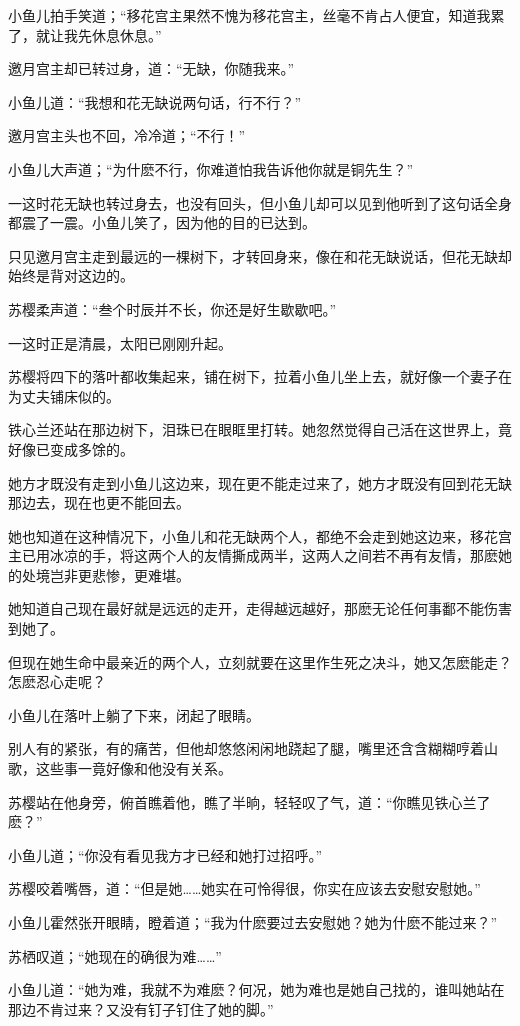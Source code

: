 \documentclass[12pt,oneside]{book}
\begin{document}
小鱼儿拍手笑道；``移花宫主果然不愧为移花宫主，丝毫不肯占人便宜，知道我累了，就让我先休息休息。''

邀月宫主却已转过身，道：``无缺，你随我来。''

小鱼儿道：``我想和花无缺说两句话，行不行？''

邀月宫主头也不回，冷冷道；``不行！''

小鱼儿大声道；``为什麽不行，你难道怕我告诉他你就是铜先生？''

一这时花无缺也转过身去，也没有回头，但小鱼儿却可以见到他听到了这句话全身都震了一震。小鱼儿笑了，因为他的目的已达到。

只见邀月宫主走到最远的一棵树下，才转回身来，像在和花无缺说话，但花无缺却始终是背对这边的。

苏樱柔声道：``叁个时辰并不长，你还是好生歇歇吧。''

一这时正是清晨，太阳已刚刚升起。

苏樱将四下的落叶都收集起来，铺在树下，拉着小鱼儿坐上去，就好像一个妻子在为丈夫铺床似的。

铁心兰还站在那边树下，泪珠已在眼眶里打转。她忽然觉得自己活在这世界上，竟好像已变成多馀的。

她方才既没有走到小鱼儿这边来，现在更不能走过来了，她方才既没有回到花无缺那边去，现在也更不能回去。

她也知道在这种情况下，小鱼儿和花无缺两个人，都绝不会走到她这边来，移花宫主已用冰凉的手，将这两个人的友情撕成两半，这两人之间若不再有友情，那麽她的处境岂非更悲惨，更难堪。

她知道自己现在最好就是远远的走开，走得越远越好，那麽无论任何事鄱不能伤害到她了。

但现在她生命中最亲近的两个人，立刻就要在这里作生死之决斗，她又怎麽能走？怎麽忍心走呢？

小鱼儿在落叶上躺了下来，闭起了眼睛。

别人有的紧张，有的痛苦，但他却悠悠闲闲地跷起了腿，嘴里还含含糊糊哼着山歌，这些事一竟好像和他没有关系。

苏樱站在他身旁，俯首瞧着他，瞧了半晌，轻轻叹了气，道：``你瞧见铁心兰了麽？''

小鱼儿道；``你没有看见我方才已经和她打过招呼。''

苏樱咬着嘴唇，道：``但是她\ldots\ldots 她实在可怜得很，你实在应该去安慰安慰她。''

小鱼儿霍然张开眼睛，瞪着道；``我为什麽要过去安慰她？她为什麽不能过来？''

苏栖叹道；``她现在的确很为难\ldots\ldots{}''

小鱼儿道：``她为难，我就不为难麽？何况，她为难也是她自己找的，谁叫她站在那边不肯过来？又没有钉子钉住了她的脚。''
\end{document}
